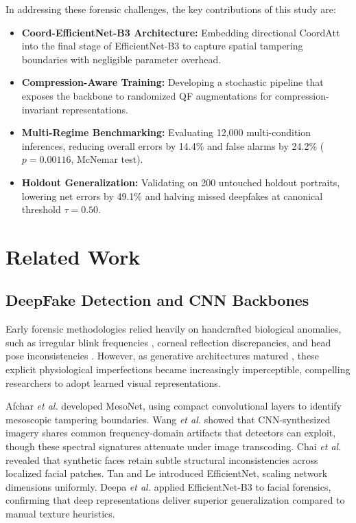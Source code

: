 \documentclass[conference]{IEEEtran}
\begin{document}
In addressing these forensic challenges, the key contributions of this study are:
\begin{itemize}
    \item \textbf{Coord-EfficientNet-B3 Architecture:} Embedding directional CoordAtt into the final stage of EfficientNet-B3 to capture spatial tampering boundaries with negligible parameter overhead.
    \item \textbf{Compression-Aware Training:} Developing a stochastic pipeline that exposes the backbone to randomized QF augmentations for compression-invariant representations.
    \item \textbf{Multi-Regime Benchmarking:} Evaluating 12,000 multi-condition inferences, reducing overall errors by 14.4\% and false alarms by 24.2\% ($p = 0.00116$, McNemar test).
    \item \textbf{Holdout Generalization:} Validating on 200 untouched holdout portraits, lowering net errors by 49.1\% and halving missed deepfakes at canonical threshold $\tau = 0.50$.
\end{itemize}

\section{Related Work}

\subsection{DeepFake Detection and CNN Backbones}
Early forensic methodologies relied heavily on handcrafted biological anomalies, such as irregular blink frequencies \cite{li2018ictu}, corneal reflection discrepancies, and head pose inconsistencies \cite{mirsky2021creation}. However, as generative architectures matured \cite{karras2019style}, these explicit physiological imperfections became increasingly imperceptible, compelling researchers to adopt learned visual representations.

Afchar \emph{et al.} \cite{afchar2018mesonet} developed MesoNet, using compact convolutional layers to identify mesoscopic tampering boundaries. Wang \emph{et al.} \cite{wang2020cnn} showed that CNN-synthesized imagery shares common frequency-domain artifacts that detectors can exploit, though these spectral signatures attenuate under image transcoding. Chai \emph{et al.} \cite{chai2020what} revealed that synthetic faces retain subtle structural inconsistencies across localized facial patches. Tan and Le \cite{tan2019efficientnet} introduced EfficientNet, scaling network dimensions uniformly. Deepa \emph{et al.} \cite{deepa2026enhanced} applied EfficientNet-B3 to facial forensics, confirming that deep representations deliver superior generalization compared to manual texture heuristics.
\end{document}
